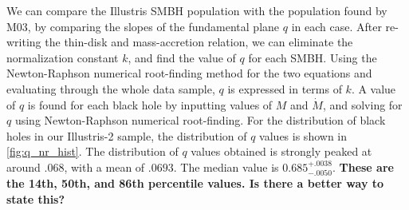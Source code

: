 We can compare the Illustris SMBH population with the population 
found by M03, by comparing the slopes of the fundamental plane $q$ 
in each case. After re-writing the thin-disk and mass-accretion 
relation, we can eliminate the normalization constant $k$, and 
find the value of $q$ for each SMBH. Using the Newton-Raphson 
numerical root-finding method for the two equations and evaluating 
through the whole data sample, $q$ is expressed in terms of $k$. 
A value of $q$ is found for each black hole by inputting values of
$M$ and $\dot{M}$, and solving for $q$ using Newton-Raphson numerical
root-finding. For the distribution of black holes in our Illustris-2
sample, the distribution of $q$ values is shown in \ref{fig:q_nr_hist}.
The distribution of $q$ values obtained is strongly peaked at around
$.068$, with a mean of $.0693$. The median value is $0.685_{-.0050}^{+.0038}$.
\textbf{These are the 14th, 50th, and 86th percentile values. Is there a better way to state this?}

